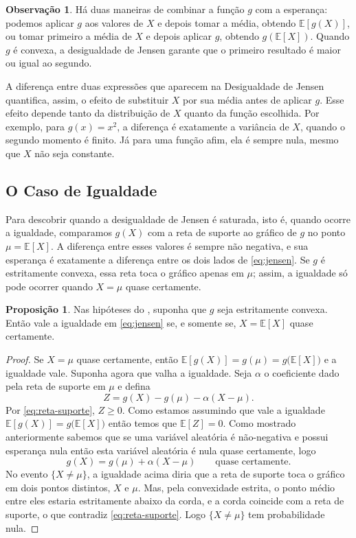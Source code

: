 \documentclass[12pt,portuguese]{article}
\theoremstyle{definition}
\newtheorem{proposition}[proposition]{Proposição}
\newtheorem{remark}[remark]{Observação}
\theoremstyle{plainexercise}
\theoremstyle{starredexercise}
\theoremstyle{definition}
\begin{document}


\begin{remark}\label{rem:jensen-media}
Há duas maneiras de combinar a função $g$ com a esperança: podemos aplicar
$g$ aos valores de $X$ e depois tomar a média, obtendo $\mathbb{E}[g(X)]$,
ou tomar primeiro a média de $X$ e depois aplicar $g$, obtendo
$g(\mathbb{E}[X])$. Quando $g$ é convexa, a desigualdade de Jensen garante
que o primeiro resultado é maior ou igual ao segundo.

A diferença entre duas expressões que aparecem na Desigualdade de Jensen quantifica, 
assim, o efeito de substituir $X$ por
sua média antes de aplicar $g$. Esse efeito depende tanto da distribuição
de $X$ quanto da função escolhida. Por exemplo, para $g(x)=x^2$, a diferença
é exatamente a variância de $X$, quando o segundo momento é finito. Já para
uma função afim, ela é sempre nula, mesmo que $X$ não seja constante.
\end{remark}

\subsection{O Caso de Igualdade}\label{subsec:jensen-igualdade}

Para descobrir quando a desigualdade de Jensen é saturada, isto é, 
quando ocorre a igualdade, comparamos $g(X)$ com a
reta de suporte ao gráfico de $g$ no ponto $\mu=\mathbb{E}[X]$. A diferença
entre esses valores é sempre não negativa, e sua esperança é exatamente a
diferença entre os dois lados de \eqref{eq:jensen}. Se $g$ é estritamente
convexa, essa reta toca o gráfico apenas em $\mu$; assim, a igualdade só pode
ocorrer quando $X=\mu$ quase certamente.

\begin{proposition}\label{prop:jensen-igualdade}
Nas hipóteses do , suponha que $g$ seja estritamente convexa.
Então vale a igualdade em \eqref{eq:jensen} se, e somente se,
$X=\mathbb{E}[X]$ quase certamente.
\end{proposition}

\begin{proof}
Se $X=\mu$ quase certamente, então $\mathbb{E}[g(X)]=g(\mu) = g\bigl(\mathbb{E}[X] \bigr)$ e a igualdade
vale. Suponha agora que valha a igualdade. Seja $\alpha$ o coeficiente dado
pela reta de suporte em $\mu$ e defina
\[
Z=g(X)-g(\mu)-\alpha(X-\mu).
\]
Por \eqref{eq:reta-suporte}, $Z\geqslant0$. Como estamos assumindo que 
vale a igualdade $\mathbb{E}[g(X)]= g\bigl(\mathbb{E}[X] \bigr)$
então temos que $\mathbb{E}[Z]=0$. Como mostrado anteriormente 
sabemos que se uma variável aleatória é não-negativa e possui esperança
nula então esta variável aleatória é nula quase certamente, logo
\[
g(X)=g(\mu)+\alpha(X-\mu)
\qquad
\text{quase certamente}.
\]
No evento $\{X\neq\mu\}$, a igualdade acima diria que a reta de suporte toca o
gráfico em dois pontos distintos, $X$ e $\mu$. Mas, pela convexidade estrita, o
ponto médio entre eles estaria estritamente abaixo da corda, e a corda coincide
com a reta de suporte, o que contradiz \eqref{eq:reta-suporte}. Logo
$\{X\neq\mu\}$ tem probabilidade nula.
\end{proof}
\end{document}
